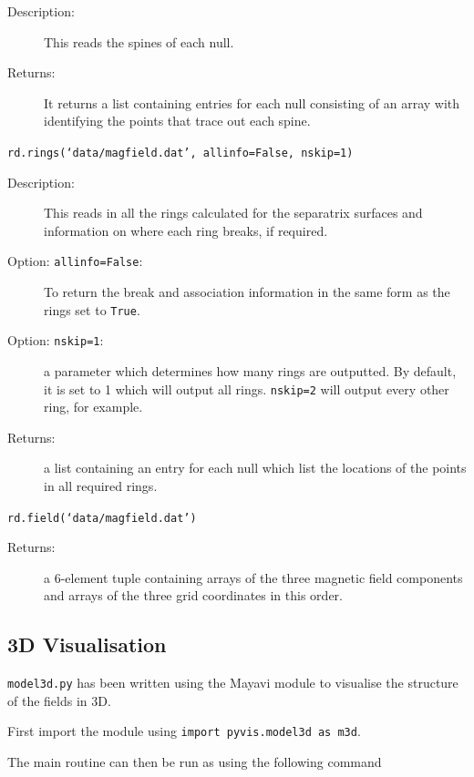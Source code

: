 \documentclass[12pt]{article}
\begin{document}
      \begin{description}
        \item [Description:] This reads the spines of each null.
        \item [Returns:] It returns a list containing entries for each null consisting of an array with identifying the points that trace out each spine.
      \end{description}

      \texttt{rd.rings(`data/magfield.dat', allinfo=False, nskip=1)}

      \begin{description}
        \item [Description:] This reads in all the rings calculated for the separatrix surfaces and information on where each ring breaks, if required.
        \item [Option: \texttt{allinfo=False}:] To return the break and association information in the same form as the rings set to \texttt{True}.
        \item [Option: \texttt{nskip=1}:] a parameter which determines how many rings are outputted. By default, it is set to 1 which will output all rings. \texttt{nskip=2} will output every other ring, for example.
        \item [Returns:] a list containing an entry for each null which list the locations of the points in all required rings.
      \end{description}

      \texttt{rd.field(`data/magfield.dat')}

      \begin{description}
        \item [Returns:] a 6-element tuple containing arrays of the three magnetic field components and arrays of the three grid coordinates in this order.
      \end{description}

    \subsection{3D Visualisation}

      \texttt{model3d.py} has been written using the Mayavi module to visualise the structure of the fields in 3D.

      First import the module using \texttt{import pyvis.model3d as m3d}.

      The main routine can then be run as using the following command
\end{document}
